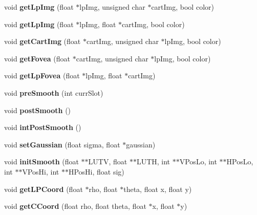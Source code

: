 \begin{DoxyCompactItemize}
\item 
void {\bfseries get\+Lp\+Img} (float $\ast$lp\+Img, unsigned char $\ast$cart\+Img, bool color)\label{classoFlow_ac9f9405d00eb91eb300ea840a997ede2}

\item 
void {\bfseries get\+Lp\+Img} (float $\ast$lp\+Img, float $\ast$cart\+Img, bool color)\label{classoFlow_aab9641c743b16c65b0a606d1e0034c6a}

\item 
void {\bfseries get\+Cart\+Img} (float $\ast$cart\+Img, unsigned char $\ast$lp\+Img, bool color)\label{classoFlow_a1e650b84efc04e14ade95db9bc9689db}

\item 
void {\bfseries get\+Fovea} (float $\ast$cart\+Img, unsigned char $\ast$lp\+Img, bool color)\label{classoFlow_a2a16080b5df663e1c18d4f4b60b921ef}

\item 
void {\bfseries get\+Lp\+Fovea} (float $\ast$lp\+Img, float $\ast$cart\+Img)\label{classoFlow_a86887cb6c58ee8db2a55683eff3e52ad}

\item 
void {\bfseries pre\+Smooth} (int curr\+Slot)\label{classoFlow_a0c13dec263edd177f81a65cf4f3cd0ef}

\item 
void {\bfseries post\+Smooth} ()\label{classoFlow_adf52e601ca02fab4debe6ecbff2b2437}

\item 
void {\bfseries int\+Post\+Smooth} ()\label{classoFlow_ac28550468e967142596abdec5e90ae9d}

\item 
void {\bfseries set\+Gaussian} (float sigma, float $\ast$gaussian)\label{classoFlow_a6833b8f8a13f7f961c70424ae4d19c79}

\item 
void {\bfseries init\+Smooth} (float $\ast$$\ast$L\+U\+T\+V, float $\ast$$\ast$L\+U\+T\+H, int $\ast$$\ast$V\+Pos\+Lo, int $\ast$$\ast$H\+Pos\+Lo, int $\ast$$\ast$V\+Pos\+Hi, int $\ast$$\ast$H\+Pos\+Hi, float sig)\label{classoFlow_a950b16ce7f50b706c4a254820f000958}

\item 
void {\bfseries get\+L\+P\+Coord} (float $\ast$rho, float $\ast$theta, float x, float y)\label{classoFlow_aee9a5fb7c896a1a3ecbb3500269a6952}

\item 
void {\bfseries get\+C\+Coord} (float rho, float theta, float $\ast$x, float $\ast$y)\label{classoFlow_a79024834f65e779748539d6160e0cf56}


\end{DoxyCompactItemize}
